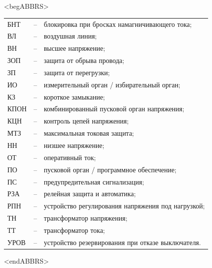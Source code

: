 \color{unimain}\section*{}
{\color{white}\fontsize{0.1pt}{0.1pt}\selectfont<begABBRS>}
\color{black}
\begin{longtable}{>{\raggedright\arraybackslash}m{2cm}>{\raggedright\arraybackslash}m{0.5cm}>{\raggedright\arraybackslash}m{20cm}}
\endfirsthead\endhead\endfoot\endlastfoot
БНТ & -- & блокировка при бросках намагничивающего тока; \\
ВЛ & -- & воздушная линия; \\
ВН & -- & высшее напряжение; \\
ЗОП & -- & защита от обрыва провода; \\
ЗП & -- & защита от перегрузки; \\
ИО & -- & измерительный орган / избирательный орган; \\
КЗ & -- & короткое замыкание; \\
КПОН & -- & комбинированный пусковой орган напряжения; \\
КЦН & -- & контроль цепей напряжения; \\
МТЗ & -- & максимальная токовая защита; \\
НН & -- & низшее напряжение; \\
ОТ & -- & оперативный ток; \\
ПО & -- & пусковой орган / программное обеспечение; \\
ПС & -- & предупредительная сигнализация; \\
РЗА & -- & релейная защита и автоматика; \\
РПН & -- & устройство регулирования напряжения под нагрузкой; \\
ТН & -- & трансформатор напряжения; \\
ТТ & -- & трансформатор тока; \\
УРОВ & -- & устройство резервирования при отказе выключателя. \\
\end{longtable}
{\color{white}\fontsize{0.1pt}{0.1pt}\selectfont<endABBRS>}